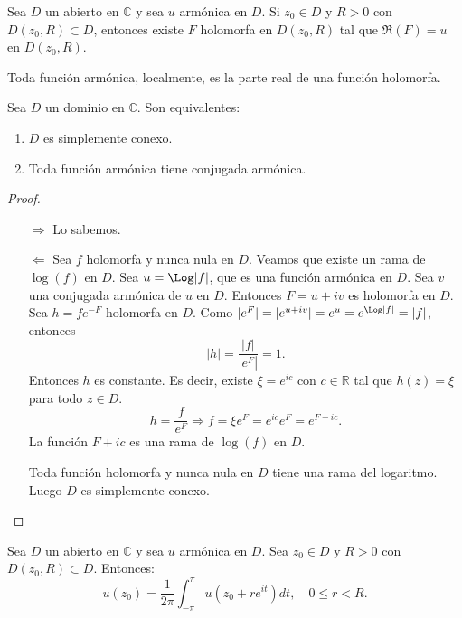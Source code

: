 \begin{corollary}
    Sea $D$ un abierto en $\mathbb{C}$ y sea $u$ armónica en $D$.
    Si $z_0 \in D$ y $R > 0$ con $D(z_0, R) \subset D$, entonces existe $F$ holomorfa en $D(z_0, R)$ tal que $\Re(F) = u$ en $D(z_0, R)$.
\end{corollary}

Toda función armónica, localmente, es la parte real de una función holomorfa.

\begin{theorem}
    Sea $D$ un dominio en $\mathbb{C}$.
    Son equivalentes:
    \begin{enumerate}
        \item $D$ es simplemente conexo.
        \item Toda función armónica tiene conjugada armónica.
    \end{enumerate}
\end{theorem}

\begin{proof}
    \hfill
    \begin{itemize}
        \item[$\boxed{\Rightarrow}$] Lo sabemos.
        \item[$\boxed{\Leftarrow}$] Sea $f$ holomorfa y nunca nula en $D$.
            Veamos que existe un rama de $\log(f)$ en $D$.
            Sea $u = \Log|f|$, que es una función armónica en $D$.
            Sea $v$ una conjugada armónica de $u$ en $D$.
            Entonces $F = u + iv$ es holomorfa en $D$.
            Sea $h = fe^{-F}$ holomorfa en $D$.
            Como $|e^F| = |e^{u+iv}| = e^u = e^{\Log|f|} = |f|$, entonces
            $$|h| = \frac{|f|}{|e^F|} = 1.$$
            Entonces $h$ es constante.
            Es decir, existe $\xi = e^{ic}$ con $c \in \mathbb{R}$ tal que $h(z) = \xi$ para todo $z \in D$.
            $$h = \frac{f}{e^F} \Rightarrow f = \xi e^F = e^{ic}e^F = e^{F + ic}.$$
            La función $F + ic$ es una rama de $\log(f)$ en $D$.

            Toda función holomorfa y nunca nula en $D$ tiene una rama del logaritmo.
            Luego $D$ es simplemente conexo.
    \end{itemize}
\end{proof}

\begin{theorem}
    Sea $D$ un abierto en $\mathbb{C}$ y sea $u$ armónica en $D$.
    Sea $z_0 \in D$ y $R > 0$ con $D(z_0, R) \subset D$.
    Entonces:
    $$u(z_0) = \frac{1}{2\pi} \int_{-\pi}^\pi u(z_0 + re^{it})dt, \quad 0 \leq r < R.$$
\end{theorem}

